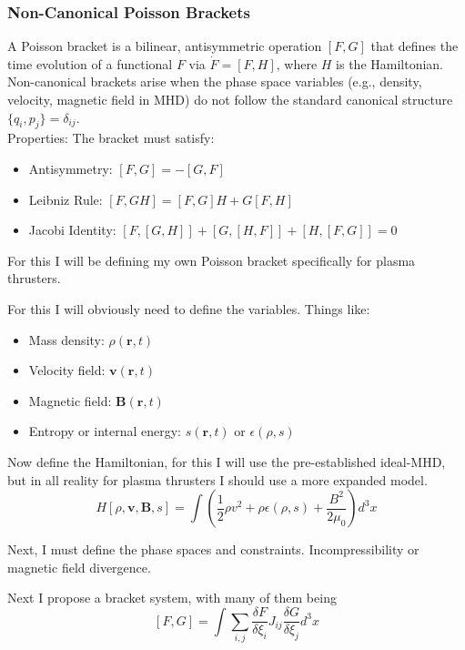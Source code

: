 \subsubsection{Non-Canonical Poisson Brackets}
\par A Poisson bracket is a bilinear, antisymmetric operation $[F, G]$ that defines the time evolution of a functional $F$ via $\dot{F} = [F, H]$, where $H$ is the Hamiltonian.  Non-canonical brackets arise when the phase space variables (e.g., density, velocity, magnetic field in MHD) do not follow the standard canonical structure $\{q_i, p_j\} = \delta_{ij}$. 
\\
Properties: The bracket must satisfy:
\\
\begin{itemize}


    \item Antisymmetry: $[F, G] = -[G, F]$
    \item Leibniz Rule: $[F, GH] = [F, G]H + G[F, H]$
    \item Jacobi Identity: $[F, [G, H]] + [G, [H, F]] + [H, [F, G]] = 0$
\end{itemize}
\par For this I will be defining my own Poisson bracket specifically for plasma thrusters.
\par For this I will obviously need to define the variables. Things like:
\begin{itemize}
    \item Mass density: $\rho(\mathbf{r}, t)$
    \item Velocity field: $\mathbf{v}(\mathbf{r}, t)$
    \item Magnetic field: $\mathbf{B}(\mathbf{r}, t)$
    \item Entropy or internal energy: $s(\mathbf{r}, t)$ or $\epsilon(\rho, s)$
\end{itemize}
\par Now define the Hamiltonian, for this I will use the pre-established ideal-MHD, but in all reality for plasma thrusters I should use a more expanded model.
$$H[\rho, \mathbf{v}, \mathbf{B}, s] = \int \left( \frac{1}{2} \rho v^2 + \rho \epsilon(\rho, s) + \frac{B^2}{2\mu_0} \right) d^3x$$
\par Next, I must define the phase spaces and constraints. Incompressibility or magnetic field divergence. 
\par Next I propose a bracket system, with many of them being 
$$[F, G] = \int \sum_{i,j} \frac{\delta F}{\delta \xi_i} J_{ij} \frac{\delta G}{\delta \xi_j} d^3x$$
